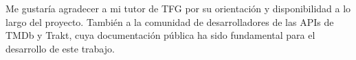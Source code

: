\thispagestyle{empty}




\vspace{-1.8cm}
Me gustaría agradecer a mi tutor de TFG por su orientación y disponibilidad a lo largo del proyecto. También a la comunidad de desarrolladores de las APIs de TMDb y Trakt, cuya documentación pública ha sido fundamental para el desarrollo de este trabajo.

